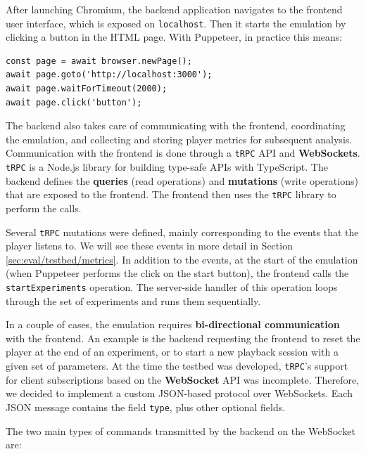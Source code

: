 After launching Chromium, the backend application navigates to the frontend user interface, which is exposed on \texttt{localhost}. Then it starts the emulation by clicking a button in the HTML page. With Puppeteer, in practice this means:

\begin{verbatim}
const page = await browser.newPage();
await page.goto('http://localhost:3000');
await page.waitForTimeout(2000);
await page.click('button');
\end{verbatim}

The backend also takes care of communicating with the frontend, coordinating the emulation, and collecting and storing player metrics for subsequent analysis. Communication with the frontend is done through a \texttt{tRPC} API and \textbf{WebSockets}. \texttt{tRPC} is a Node.js library for building type-safe APIs with TypeScript. The backend defines the \textbf{queries} (read operations) and \textbf{mutations} (write operations) that are exposed to the frontend. The frontend then uses the \texttt{tRPC} library to perform the calls.

Several \texttt{tRPC} mutations were defined, mainly corresponding to the events that the player listens to. We will see these events in more detail in Section \ref{sec:eval/testbed/metrics}. In addition to the events, at the start of the emulation (when Puppeteer performs the click on the start button), the frontend calls the \texttt{startExperiments} operation. The server-side handler of this operation loops through the set of experiments and runs them sequentially.

In a couple of cases, the emulation requires \textbf{bi-directional communication} with the frontend. An example is the backend requesting the frontend to reset the player at the end of an experiment, or to start a new playback session with a given set of parameters. At the time the testbed was developed, \texttt{tRPC}'s support for client subscriptions based on the \textbf{WebSocket} API was incomplete. Therefore, we decided to implement a custom JSON-based protocol over WebSockets. Each JSON message contains the field \texttt{type}, plus other optional fields.

The two main types of commands transmitted by the backend on the WebSocket are:

